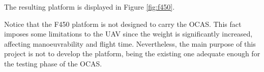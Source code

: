 The resulting platform is displayed in Figure \ref{fig:f450}.



Notice that the F450 platform is not designed to carry the OCAS.
This fact imposes some limitations to the UAV since the weight is significantly increased, affecting manoeuvrability and flight time.
Nevertheless, the main purpose of this project is not to develop the platform, being the existing one adequate enough for the testing phase of the OCAS.
